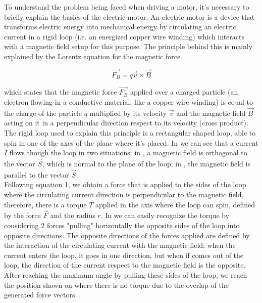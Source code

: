 To understand the problem being faced when driving a motor, it's necessary to briefly explain the basics of the electric motor. An electric motor is a device that transforms electric energy into mechanical energy by circulating an electric current in a rigid loop (i.e. an energized copper wire winding) which interacts with a magnetic field setup for this purpose. The principle behind this is mainly explained by the Lorentz equation for the magnetic force \cite{MaxwellEqs}

\begin{equation}
\overrightarrow{F_{B}}=q\overrightarrow{v}\times\overrightarrow{B}
\end{equation}

which states that the magnetic force $\overrightarrow{F_{B}}$ applied over a charged particle (an electron flowing in a conductive material, like a copper wire winding) is equal to the charge of the particle $q$ multiplied by its velocity $\overrightarrow{v}$ and the magnetic field $\overrightarrow{B}$ acting on it in a perpendicular direction respect to its velocity (cross product). The rigid loop used to explain this principle is a rectangular shaped loop, able to spin in one of the axes of the plane where it's placed. In  we can see that a current $I$ flows though the loop in two situations: in , a magnetic field is orthogonal to the vector $\overrightarrow{S}$, which is normal to the plane of the loop; in , the magnetic field is parallel to the vector $\overrightarrow{S}$. \\

Following equation 1, we obtain a force that is applied to the sides of the loop where the circulating current direction is perpendicular to the magnetic field, therefore, there is a torque $T$ applied in the axis where the loop can spin, defined by the force $\overrightarrow{F}$ and the radius $r$. In  we can easily recognize the torque by considering 2 forces "pulling" horizontally the opposite sides of the loop into opposite directions. The opposite directions of the forces applied are defined by the interaction of the circulating current with the magnetic field: when the current enters the loop, it goes in one direction, but when if comes out of the loop, the direction of the current respect to the magnetic field is the opposite. After reaching the maximum angle by pulling these sides of the loop, we reach the position shown on  where there is no torque due to the overlap of the generated force vectors. \\


